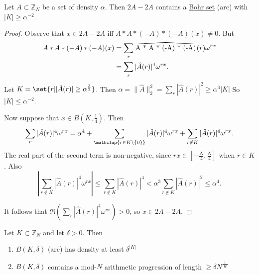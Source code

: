 \documentclass{article}
\newcommand\reallywidehat[1]{%
\savestack{\tmpbox}{\stretchto{%
  \scaleto{%
    \scalerel*[\widthof{\ensuremath{#1}}]{\kern.1pt\mathchar"0362\kern.1pt}%
    {\rule{0ex}{\textheight}}%
  }{\textheight}%
}{2.4ex}}%
\stackon[-6.9pt]{#1}{\tmpbox}%
}
\newcommand{\1}[1]{\mathbbm{1}_{#1}}
\begin{document}
\begin{nlemma}
  Let $A \subset \mathbb{Z}_N$ be a set of density $\alpha$. Then $2A - 2A$ contains a \hyperlink{def:bohr}{Bohr set} (arc) with $|K| \geq \alpha^{-2}$.
\end{nlemma}
\begin{proof}
  Observe that $x \in 2A - 2A$ iff $A * A * (-A) * (-A)(x) \neq 0$.
  But
  \begin{align*}
    A * A * (-A) * (-A) (x) &= \sum_r \reallywidehat{A * A * (-A) * (-A)} (r) \omega^{r x} \\
                            &= \sum_r |\hat{A}(r)|^4 \omega^{r x}.
  \end{align*}
  Let $K = \set{r | |\hat{A}(r)| \geq \alpha^\frac{3}{2}}$.
  Then $\alpha = \|\hat{A}\|^2_2 = \sum_r |\hat{A}(r)|^2 \geq \alpha^3 |K|$
  So $|K| \leq \alpha^{-2}$.

  Now suppose that $x \in B(K, \frac{1}{4})$.
  Then
  \begin{align*}
    \sum_r |\hat{A}(r)|^4 \omega^{r x} = \alpha^4 + \sum_{\mathclap{r \in K \setminus \{0\}}} |\hat{A}(r)|^4 \omega^{rx} + \sum_{r \notin K} |\hat{A}(r)|^4 \omega^{r x}.
  \end{align*}
  The real part of the second term is non-negative, since $r x \in \left[-\frac{N}{4}, \frac{N}{4}\right]$ when $r \in K$.
  Also
  \begin{equation*}
    \left|\sum_{r \notin K} |\hat{A}(r)|^4 \omega^{r x}\right| \leq \sum_{r \notin K} |\hat{A}(r)|^4 < \alpha^3 \sum_{r \notin K} |\hat{A}(r)|^2 \leq \alpha^4.
  \end{equation*}

  It follows that $\Re \left(\sum_r |\hat{A}(r)|^4 \omega^{r x}\right) > 0$, so $x \in 2A - 2A$.
\end{proof}
\begin{nlemma}
  Let $K \subset \mathbb{Z}_N$ and let $\delta > 0$. Then
  \begin{enumerate}[label=(\roman*)]
    \item $B(K, \delta)$ (arc) has density at least $\delta^{|K|}$
    \item $B(K, \delta)$ contains a mod-$N$ arithmetic progression of length $\geq \delta N^\frac{1}{|K|}$
  \end{enumerate}
\end{nlemma}
\end{document}

